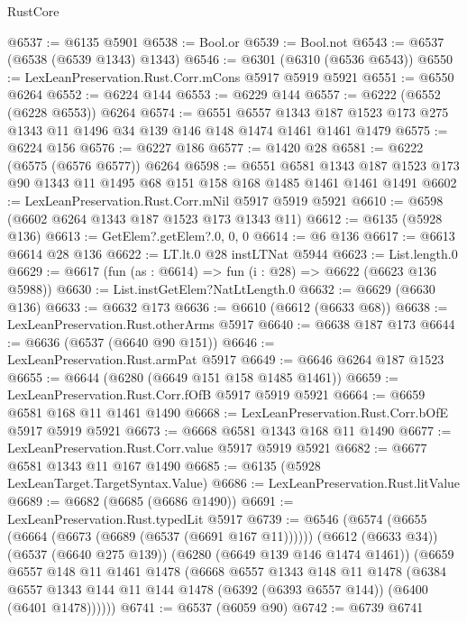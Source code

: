 \begin{lexlean}{RustCore}
\begin{coremodule}
@6537 := @6135 @5901
@6538 := Bool.or
@6539 := Bool.not
@6543 := @6537 (@6538 (@6539 @1343) @1343)
@6546 := @6301 (@6310 (@6536 @6543))
@6550 := LexLeanPreservation.Rust.Corr.mCons @5917 @5919 @5921
@6551 := @6550 @6264
@6552 := @6224 @144
@6553 := @6229 @144
@6557 := @6222 (@6552 (@6228 @6553)) @6264
@6574 := @6551
    @6557
    @1343
    @187
    @1523
    @173
    @275
    @1343
    @11
    @1496
    @34
    @139
    @146
    @148
    @1474
    @1461
    @1461
    @1479
@6575 := @6224 @156
@6576 := @6227 @186
@6577 := @1420 @28
@6581 := @6222 (@6575 (@6576 @6577)) @6264
@6598 := @6551
    @6581
    @1343
    @187
    @1523
    @173
    @90
    @1343
    @11
    @1495
    @68
    @151
    @158
    @168
    @1485
    @1461
    @1461
    @1491
@6602 := LexLeanPreservation.Rust.Corr.mNil @5917 @5919 @5921
@6610 := @6598 (@6602 @6264 @1343 @187 @1523 @173 @1343 @11)
@6612 := @6135 (@5928 @136)
@6613 := GetElem?.getElem?.{0, 0, 0}
@6614 := @6 @136
@6617 := @6613 @6614 @28 @136
@6622 := LT.lt.{0} @28 instLTNat @5944
@6623 := List.length.{0}
@6629 := @6617 (fun (as : @6614) => fun (i : @28) => @6622 (@6623 @136 @5988))
@6630 := List.instGetElem?NatLtLength.{0}
@6632 := @6629 (@6630 @136)
@6633 := @6632 @173
@6636 := @6610 (@6612 (@6633 @68))
@6638 := LexLeanPreservation.Rust.otherArms @5917
@6640 := @6638 @187 @173
@6644 := @6636 (@6537 (@6640 @90 @151))
@6646 := LexLeanPreservation.Rust.armPat @5917
@6649 := @6646 @6264 @187 @1523
@6655 := @6644 (@6280 (@6649 @151 @158 @1485 @1461))
@6659 := LexLeanPreservation.Rust.Corr.fOfB @5917 @5919 @5921
@6664 := @6659 @6581 @168 @11 @1461 @1490
@6668 := LexLeanPreservation.Rust.Corr.bOfE @5917 @5919 @5921
@6673 := @6668 @6581 @1343 @168 @11 @1490
@6677 := LexLeanPreservation.Rust.Corr.value @5917 @5919 @5921
@6682 := @6677 @6581 @1343 @11 @167 @1490
@6685 := @6135 (@5928 LexLeanTarget.TargetSyntax.Value)
@6686 := LexLeanPreservation.Rust.litValue
@6689 := @6682 (@6685 (@6686 @1490))
@6691 := LexLeanPreservation.Rust.typedLit @5917
@6739 := @6546
    (@6574
      (@6655 (@6664 (@6673 (@6689 (@6537 (@6691 @167 @11))))))
      (@6612 (@6633 @34))
      (@6537 (@6640 @275 @139))
      (@6280 (@6649 @139 @146 @1474 @1461))
      (@6659
        @6557
        @148
        @11
        @1461
        @1478
        (@6668
          @6557
          @1343
          @148
          @11
          @1478
          (@6384
            @6557
            @1343
            @144
            @11
            @144
            @1478
            (@6392 (@6393 @6557 @144))
            (@6400 (@6401 @1478))))))
@6741 := @6537 (@6059 @90)
@6742 := @6739 @6741

\end{coremodule}
\end{lexlean}
